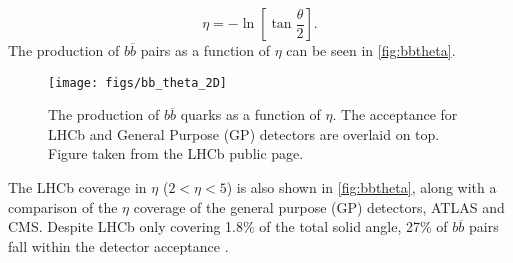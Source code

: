\begin{equation}
  \eta = -\ln[\tan\frac{\theta}{2}].
\end{equation}
The production of $b\overline{b}$ pairs as a function of $\eta$ can be seen in \autoref{fig:bbtheta}.
\begin{figure}[!h]
  \centering
  \texttt{[image: figs/bb\_theta\_2D]}
  \caption{The production of $b\overline{b}$ quarks as a function of $\eta$. The acceptance for LHCb and General Purpose (\Gls{GP}) detectors are overlaid on top. Figure taken from the LHCb public page.}
\label{fig:bbtheta}    
\end{figure}
The LHCb coverage in $\eta$ ($2<\eta<5$) is also shown in \autoref{fig:bbtheta}, along with a comparison of the $\eta$ coverage of the general purpose (GP) detectors, ATLAS and CMS. %
Despite LHCb only covering 1.8\% of the total solid angle, 27\% of $b\overline{b}$ pairs fall within the detector acceptance \cite{LHCb-DP-2014-001}. 

